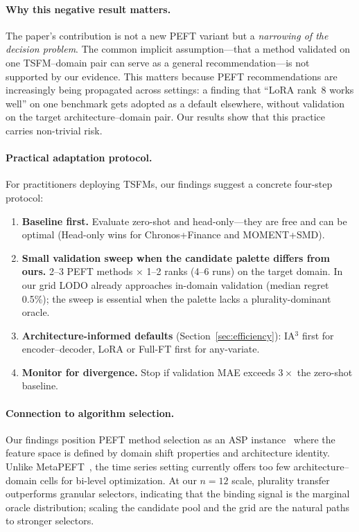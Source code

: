 \documentclass{article}
\begin{document}
\paragraph{Why this negative result matters.}
The paper's contribution is not a new PEFT variant but a \emph{narrowing of the decision problem}. The common implicit assumption---that a method validated on one TSFM--domain pair can serve as a general recommendation---is not supported by our evidence. This matters because PEFT recommendations are increasingly being propagated across settings: a finding that ``LoRA rank~8 works well'' on one benchmark gets adopted as a default elsewhere, without validation on the target architecture--domain pair. Our results show that this practice carries non-trivial risk.

\paragraph{Practical adaptation protocol.}
For practitioners deploying TSFMs, our findings suggest a concrete four-step protocol:
\begin{enumerate}[nosep,leftmargin=*]
  \item \textbf{Baseline first.} Evaluate zero-shot and head-only---they are free and can be optimal (Head-only wins for Chronos+Finance and MOMENT+SMD).
  \item \textbf{Small validation sweep when the candidate palette differs from ours.} 2--3 PEFT methods $\times$ 1--2 ranks (4--6 runs) on the target domain. In our grid LODO already approaches in-domain validation (median regret 0.5\%); the sweep is essential when the palette lacks a plurality-dominant oracle.
  \item \textbf{Architecture-informed defaults} (Section~\ref{sec:efficiency}): IA$^3$ first for encoder--decoder, LoRA or Full-FT first for any-variate.
  \item \textbf{Monitor for divergence.} Stop if validation MAE exceeds $3\times$ the zero-shot baseline.
\end{enumerate}

\paragraph{Connection to algorithm selection.}
Our findings position PEFT method selection as an ASP instance~\citep{rice1976algorithm} where the feature space is defined by domain shift properties and architecture identity. Unlike MetaPEFT~\citep{tian2025metapeft}, the time series setting currently offers too few architecture--domain cells for bi-level optimization. At our $n{=}12$ scale, plurality transfer outperforms granular selectors, indicating that the binding signal is the marginal oracle distribution; scaling the candidate pool and the grid are the natural paths to stronger selectors.
\end{document}
